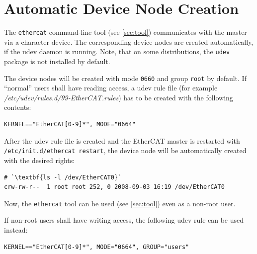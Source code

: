 \documentclass[a4paper,12pt,BCOR6mm,bibtotoc,idxtotoc]{scrbook}
\begin{document}
\section{Automatic Device Node Creation}
\label{sec:autonode}

The \lstinline+ethercat+ command-line tool (see \autoref{sec:tool})
communicates with the master via a character device. The corresponding device
nodes are created automatically, if the udev daemon is running.  Note, that on
some distributions, the \lstinline+udev+ package is not installed by default.

The device nodes will be created with mode \lstinline+0660+ and group
\lstinline+root+ by default. If ``normal'' users shall have reading access, a
udev rule file (for example \textit{/etc/udev/rules.d/99-EtherCAT.rules}) has
to be created with the following contents:

\begin{lstlisting}
KERNEL=="EtherCAT[0-9]*", MODE="0664"
\end{lstlisting}

After the udev rule file is created and the EtherCAT master is restarted with
\lstinline[breaklines=true]+/etc/init.d/ethercat restart+, the device node
will be automatically created with the desired rights:

\begin{lstlisting}
# `\textbf{ls -l /dev/EtherCAT0}`
crw-rw-r--  1 root root 252, 0 2008-09-03 16:19 /dev/EtherCAT0
\end{lstlisting}

Now, the \lstinline+ethercat+ tool can be used (see \autoref{sec:tool}) even
as a non-root user.

If non-root users shall have writing access, the following udev rule can be
used instead:

\begin{lstlisting}
KERNEL=="EtherCAT[0-9]*", MODE="0664", GROUP="users"
\end{lstlisting}

\end{document}
